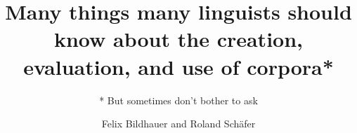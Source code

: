 \title{Many things many linguists should know about the creation, evaluation, and use of corpora*}
\subtitle{* But sometimes don’t bother to ask}
\dedication{In memory of Adam Kilgarriff.}
\author{Felix Bildhauer and Roland Schäfer}
\renewcommand{\lsISBNdigital}{000-0-000000-00-0}
\renewcommand{\lsISBNhardcover}{000-0-000000-00-0}
\renewcommand{\lsISBNsoftcover}{000-0-000000-00-0}
\renewcommand{\lsISBNsoftcoverus}{000-0-000000-00-0}
\renewcommand{\lsSeries}{tbls}
\renewcommand{\lsSeriesNumber}{99}
  
